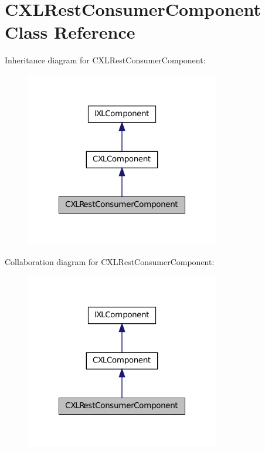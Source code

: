 \hypertarget{classCXLRestConsumerComponent}{
\section{CXLRestConsumerComponent Class Reference}
\label{classCXLRestConsumerComponent}
}


Inheritance diagram for CXLRestConsumerComponent:\nopagebreak
\begin{figure}[H]
\begin{center}
\leavevmode
\includegraphics[width=240pt]{classCXLRestConsumerComponent__inherit__graph}
\end{center}
\end{figure}


Collaboration diagram for CXLRestConsumerComponent:\nopagebreak
\begin{figure}[H]
\begin{center}
\leavevmode
\includegraphics[width=240pt]{classCXLRestConsumerComponent__coll__graph}
\end{center}
\end{figure}
